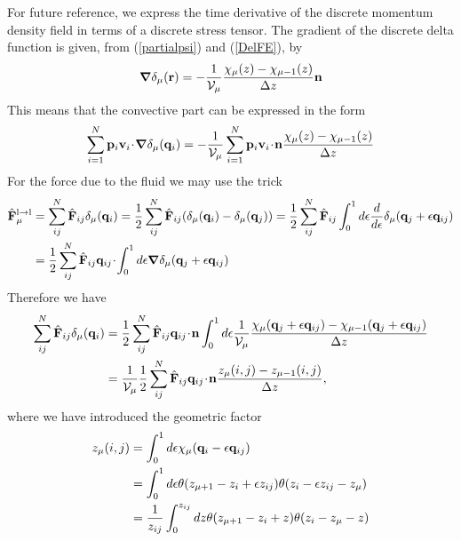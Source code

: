 \documentclass[b5paper,openright,10pt]{book}
\newcommand{\esc}{\!\cdot\!}
\begin{document}
For future reference,  we express the time derivative  of the discrete
momentum density field  in terms of a discrete stress  tensor. 
The  gradient   of  the  discrete   delta  function  is   given,  from
(\ref{partialpsi}) and (\ref{DelFE}), by
\begin{align}
  \boldsymbol{\nabla}\delta_\mu({\bf r})=-\frac{1}{{\cal V}_\mu}\frac{\chi_\mu(z)-\chi_{\mu-1}(z)}{\Delta z} {\bf n}
\end{align}
This means that the convective part can be expressed in the form
\begin{align}
  \sum_{i=1}^N{\bf p}_i{\bf v}_i\esc\boldsymbol{\nabla}\delta_\mu({\bf q}_i)&=
-\frac{1}{{\cal V}_\mu} \sum_{i=1}^N{\bf p}_i{\bf v}_i\esc{\bf n}\frac{\chi_\mu(z)-\chi_{\mu-1}(z)}{\Delta z}
\nonumber\\ 
\end{align}
For the force due to the fluid we may use the trick
\begin{align}
  \hat{{\bf F}}_\mu^{\rm l\to l}&=  \sum_{ij}^N\hat{\bf F}_{ij}\delta_\mu({\bf q}_i)
=\frac{1}{2}\sum_{ij}^N\hat{\bf F}_{ij}
(\delta_\mu({\bf q}_i)-\delta_\mu({\bf q}_j))
=\frac{1}{2}\sum_{ij}^N\hat{\bf F}_{ij}\int_0^1d\epsilon \frac{d}{d\epsilon}
\delta_\mu({\bf q}_j+\epsilon{\bf q}_{ij})
\nonumber\\
&=\frac{1}{2}\sum_{ij}^N\hat{\bf F}_{ij}{\bf q}_{ij}\esc\int_0^1d\epsilon 
\boldsymbol{\nabla}\delta_\mu({\bf q}_j+\epsilon{\bf q}_{ij})
\end{align}
Therefore we have
\begin{align}
   \sum_{ij}^N\hat{\bf F}_{ij}\delta_\mu({\bf q}_i)
   &=\frac{1}{2}\sum_{ij}^N\hat{\bf F}_{ij}{\bf q}_{ij}\esc{\bf n}
\int_0^1d\epsilon 
\frac{1}{{\cal V}_\mu}\frac{\chi_\mu({\bf q}_j+\epsilon{\bf q}_{ij})-\chi_{\mu-1}({\bf q}_j+\epsilon{\bf q}_{ij})}{\Delta z} 
\nonumber\\
& 
=\frac{1}{{\cal V}_\mu}\frac{1}{2}\sum_{ij}^N\hat{\bf F}_{ij}{\bf q}_{ij}\esc{\bf n}
\frac{z_\mu(i,j)-z_{\mu-1}(i,j)}{\Delta z},
\label{Fvir}
\end{align}
where we have introduced the geometric factor 
\begin{align}
z_\mu(i,j)&=  \int_0^{1}d\epsilon\chi_\mu({\bf q}_i-\epsilon{\bf q}_{ij})
\nonumber\\
&=  \int_0^{1}d\epsilon
\theta(z_{\mu+1}-z_i+\epsilon z_{ij})\theta(z_i-\epsilon z_{ij}-z_\mu)
\nonumber\\
&= \frac{1}{z_{ij}} \int_0^{z_{ij}}dz
\theta(z_{\mu+1}-z_i+z)\theta(z_i-z_\mu-z)
\label{int}
\end{align}
\end{document}
